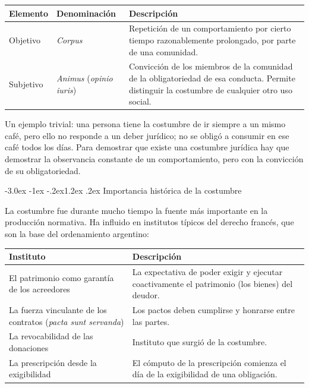 \documentclass[12pt,oneside]{book}
\makeatletter
\renewcommand\section{\@startsection{section}{1}{\z@}%
  {-3.0ex \@plus -1ex \@minus -.2ex}{1.2ex \@plus .2ex}%
  {\normalfont\large\bfseries\color{acento}}}
\makeatother
\begin{document}
\begin{table}[H]
\centering
\begin{tabularx}{\textwidth}{>{\raggedright\arraybackslash}p{} >{\raggedright\arraybackslash}p{} >{\raggedright\arraybackslash}X}
\toprule
\textbf{Elemento} & \textbf{Denominación} & \textbf{Descripción} \\
\midrule
Objetivo & \textit{Corpus} & Repetición de un comportamiento por cierto tiempo razonablemente prolongado, por parte de una comunidad. \\
\addlinespace
Subjetivo & \textit{Animus} (\textit{opinio iuris}) & Convicción de los miembros de la comunidad de la obligatoriedad de esa conducta. Permite distinguir la costumbre de cualquier otro uso social. \\
\bottomrule
\end{tabularx}
\end{table}

\begin{ejemplo}
Un ejemplo trivial: una persona tiene la costumbre de ir siempre a un mismo café, pero ello no responde a un deber jurídico; no se obligó a consumir en ese café todos los días. Para demostrar que existe una costumbre jurídica hay que demostrar la observancia constante de un comportamiento, pero con la convicción de su obligatoriedad.
\end{ejemplo}

\section{Importancia histórica de la costumbre}

La costumbre fue durante mucho tiempo la fuente más importante en la producción normativa. Ha influido en institutos típicos del derecho francés, que son la base del ordenamiento argentino:

\begin{table}[H]
\centering
\begin{tabularx}{\textwidth}{>{\raggedright\arraybackslash}p{} >{\raggedright\arraybackslash}X}
\toprule
\textbf{Instituto} & \textbf{Descripción} \\
\midrule
El patrimonio como garantía de los acreedores & La expectativa de poder exigir y ejecutar coactivamente el patrimonio (los bienes) del deudor. \\
\addlinespace
La fuerza vinculante de los contratos (\textit{pacta sunt servanda}) & Los pactos deben cumplirse y honrarse entre las partes. \\
\addlinespace
La revocabilidad de las donaciones & Instituto que surgió de la costumbre. \\
\addlinespace
La prescripción desde la exigibilidad & El cómputo de la prescripción comienza el día de la exigibilidad de una obligación. \\
\bottomrule
\end{tabularx}
\end{table}
\end{document}
